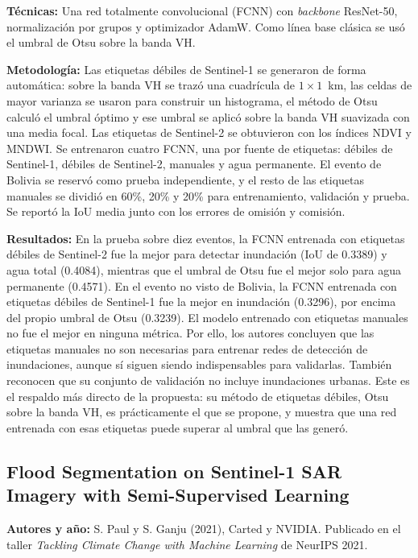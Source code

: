 \documentclass[conference]{IEEEtran}
\begin{document}
\textbf{Técnicas:} Una red totalmente convolucional (FCNN) con \textit{backbone} ResNet-50, normalización por grupos y optimizador AdamW. Como línea base clásica se usó el umbral de Otsu sobre la banda VH.

\textbf{Metodología:} Las etiquetas débiles de Sentinel-1 se generaron de forma automática: sobre la banda VH se trazó una cuadrícula de $1\times1$~km, las celdas de mayor varianza se usaron para construir un histograma, el método de Otsu calculó el umbral óptimo y ese umbral se aplicó sobre la banda VH suavizada con una media focal. Las etiquetas de Sentinel-2 se obtuvieron con los índices NDVI y MNDWI. Se entrenaron cuatro FCNN, una por fuente de etiquetas: débiles de Sentinel-1, débiles de Sentinel-2, manuales y agua permanente. El evento de Bolivia se reservó como prueba independiente, y el resto de las etiquetas manuales se dividió en 60\%, 20\% y 20\% para entrenamiento, validación y prueba. Se reportó la IoU media junto con los errores de omisión y comisión.

\textbf{Resultados:} En la prueba sobre diez eventos, la FCNN entrenada con etiquetas débiles de Sentinel-2 fue la mejor para detectar inundación (IoU de 0.3389) y agua total (0.4084), mientras que el umbral de Otsu fue el mejor solo para agua permanente (0.4571). En el evento no visto de Bolivia, la FCNN entrenada con etiquetas débiles de Sentinel-1 fue la mejor en inundación (0.3296), por encima del propio umbral de Otsu (0.3239). El modelo entrenado con etiquetas manuales no fue el mejor en ninguna métrica. Por ello, los autores concluyen que las etiquetas manuales no son necesarias para entrenar redes de detección de inundaciones, aunque sí siguen siendo indispensables para validarlas. También reconocen que su conjunto de validación no incluye inundaciones urbanas. Este es el respaldo más directo de la propuesta: su método de etiquetas débiles, Otsu sobre la banda VH, es prácticamente el que se propone, y muestra que una red entrenada con esas etiquetas puede superar al umbral que las generó.

\subsection{Flood Segmentation on Sentinel-1 SAR Imagery with Semi-Supervised Learning \cite{paul2021flood}}
 
\textbf{Autores y año:} S. Paul y S. Ganju (2021), Carted y NVIDIA. Publicado en el taller \textit{Tackling Climate Change with Machine Learning} de NeurIPS 2021.
 
\end{document}
